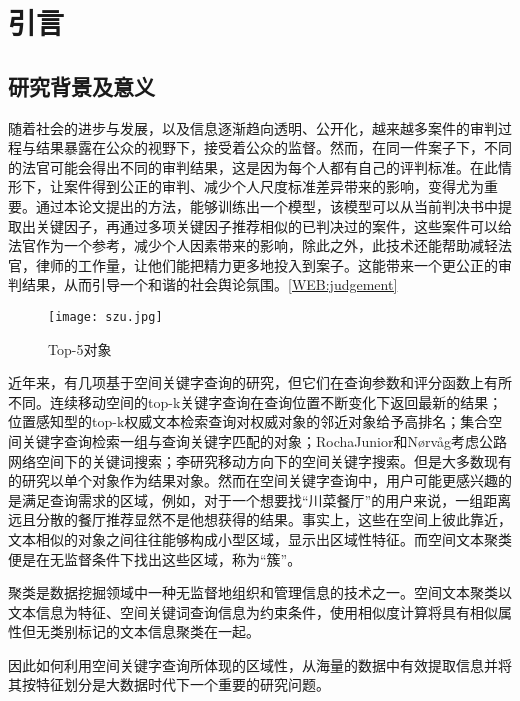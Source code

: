 \section{引言}

\subsection{研究背景及意义}
随着社会的进步与发展，以及信息逐渐趋向透明、公开化，越来越多案件的审判过程与结果暴露在公众的视野下，接受着公众的监督。然而，在同一件案子下，不同的法官可能会得出不同的审判结果，这是因为每个人都有自己的评判标准。在此情形下，让案件得到公正的审判、减少个人尺度标准差异带来的影响，变得尤为重要。通过本论文提出的方法，能够训练出一个模型，该模型可以从当前判决书中提取出关键因子，再通过多项关键因子推荐相似的已判决过的案件，这些案件可以给法官作为一个参考，减少个人因素带来的影响，除此之外，此技术还能帮助减轻法官，律师的工作量，让他们能把精力更多地投入到案子。这能带来一个更公正的审判结果，从而引导一个和谐的社会舆论氛围。\ref{WEB:judgement}

\begin{figure}[htbp]
	\begin{center}
		\texttt{[image: szu.jpg]}
		\caption{Top-5对象}
		\label{top5object}
	\end{center}
\end{figure}

近年来，有几项基于空间关键字查询的研究，但它们在查询参数和评分函数上有所不同。连续移动空间的top-k关键字查询在查询位置不断变化下返回最新的结果；位置感知型的top-k权威文本检索查询对权威对象的邻近对象给予高排名；集合空间关键字查询检索一组与查询关键字匹配的对象；RochaJunior和Nørvåg考虑公路网络空间下的关键词搜索；李研究移动方向下的空间关键字搜索。但是大多数现有的研究以单个对象作为结果对象。然而在空间关键字查询中，用户可能更感兴趣的是满足查询需求的区域，例如，对于一个想要找“川菜餐厅”的用户来说，一组距离远且分散的餐厅推荐显然不是他想获得的结果。事实上，这些在空间上彼此靠近，文本相似的对象之间往往能够构成小型区域，显示出区域性特征。而空间文本聚类便是在无监督条件下找出这些区域，称为“簇”。

聚类是数据挖掘领域中一种无监督地组织和管理信息的技术之一。空间文本聚类以文本信息为特征、空间关键词查询信息为约束条件，使用相似度计算将具有相似属性但无类别标记的文本信息聚类在一起。

因此如何利用空间关键字查询所体现的区域性，从海量的数据中有效提取信息并将其按特征划分是大数据时代下一个重要的研究问题。

